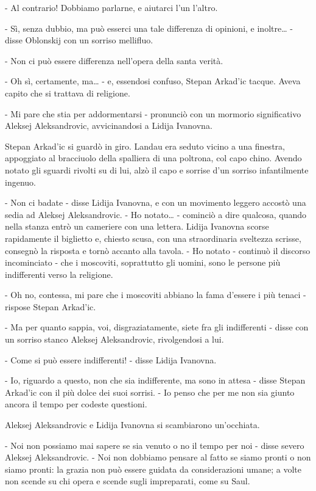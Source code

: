 - Al contrario! Dobbiamo parlarne, e aiutarci l'un l'altro. 

- Sì, senza dubbio, ma può esserci una tale differenza di opinioni, e inoltre\ldots{} - disse Oblonskij con un sorriso mellifluo. 

- Non ci può essere differenza nell'opera della santa verità. 

- Oh sì, certamente, ma\ldots{} - e, essendosi confuso, Stepan Arkad'ic tacque. Aveva capito che si trattava di religione. 

- Mi pare che stia per addormentarsi - pronunciò con un mormorio significativo Aleksej Aleksandrovic, avvicinandosi a Lidija Ivanovna. 

Stepan Arkad'ic si guardò in giro. Landau era seduto vicino a una finestra, appoggiato al bracciuolo della spalliera di una poltrona, col capo chino. Avendo notato gli sguardi rivolti su di lui, alzò il capo e sorrise d'un sorriso infantilmente ingenuo. 

- Non ci badate - disse Lidija Ivanovna, e con un movimento leggero accostò una sedia ad Aleksej Aleksandrovic. - Ho notato\ldots{} - cominciò a dire qualcosa, quando nella stanza entrò un cameriere con una lettera. Lidija Ivanovna scorse rapidamente il biglietto e, chiesto scusa, con una straordinaria sveltezza scrisse, consegnò la risposta e tornò accanto alla tavola. - Ho notato - continuò il discorso incominciato - che i moscoviti, soprattutto gli uomini, sono le persone più indifferenti verso la religione. 

- Oh no, contessa, mi pare che i moscoviti abbiano la fama d'essere i più tenaci - rispose Stepan Arkad'ic. 

- Ma per quanto sappia, voi, disgraziatamente, siete fra gli indifferenti - disse con un sorriso stanco Aleksej Aleksandrovic, rivolgendosi a lui. 

- Come si può essere indifferenti! - disse Lidija Ivanovna. 

- Io, riguardo a questo, non che sia indifferente, ma sono in attesa - disse Stepan Arkad'ic con il più dolce dei suoi sorrisi. - Io penso che per me non sia giunto ancora il tempo per codeste questioni. 

Aleksej Aleksandrovic e Lidija Ivanovna si scambiarono un'occhiata. 

- Noi non possiamo mai sapere se sia venuto o no il tempo per noi - disse severo Aleksej Aleksandrovic. - Noi non dobbiamo pensare al fatto se siamo pronti o non siamo pronti: la grazia non può essere guidata da considerazioni umane; a volte non scende su chi opera e scende sugli impreparati, come su Saul. 

